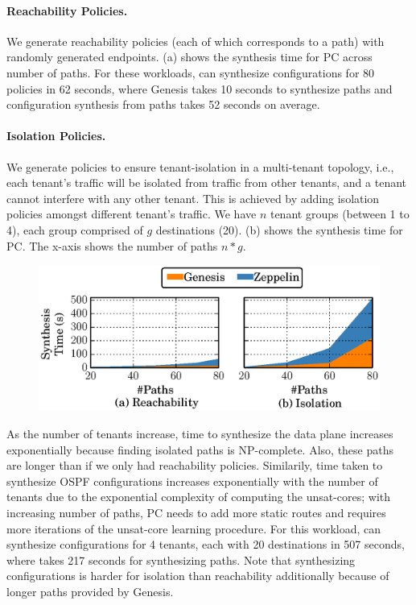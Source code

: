 \paragraph{Reachability Policies.}
We generate reachability policies (each of which 
corresponds to a path) with randomly generated endpoints.
(a) shows the synthesis time for
PC across number of paths. 
For these workloads, \name can
synthesize configurations for 80 policies in 62 
seconds, where Genesis takes 10 seconds to synthesize paths 
and configuration synthesis from paths 
takes 52 seconds on average.

\paragraph{Isolation Policies.}
We generate policies to ensure tenant-isolation
in a multi-tenant topology, i.e., each
tenant's traffic will be isolated from traffic from
other tenants, and a tenant cannot interfere with any 
other tenant. This is achieved by adding isolation policies
amongst different tenant's traffic. 
We have $n$ tenant groups (between 1 to 4), 
each group comprised of $g$ destinations (20). 
(b)
shows the synthesis time 
for PC.
The x-axis shows the number of paths $n * g$. 
 
 \begin{figure}
  	\vspace{-4mm}
 	\includegraphics[width=\columnwidth]{figures/ospfisolation.eps}
 	\vspace{-8pt}
 \end{figure}
 

 As the number of tenants increase, time to 
synthesize the data plane increases exponentially 
because finding isolated paths is NP-complete. Also, these
paths are longer than if we only had reachability policies. 
Similarily, time taken to synthesize 
OSPF configurations increases exponentially with the 
number of tenants due to the exponential complexity of computing 
the unsat-cores; with increasing number of 
paths, PC needs to add more static routes 
and requires more iterations of the unsat-core learning
procedure. 
For this workload, \name can
synthesize configurations for 4 tenants, each with
20 destinations in 507 seconds, where \genesis takes 217 seconds
for synthesizing paths. Note that synthesizing 
configurations is harder for isolation than reachability 
additionally because of longer paths provided by Genesis.


